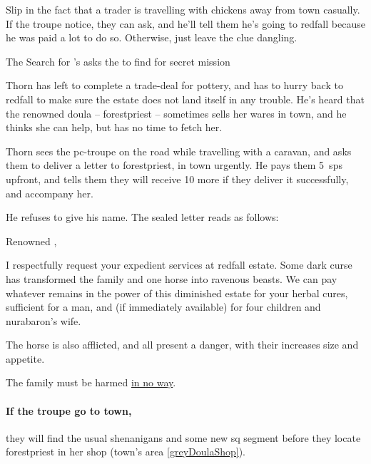 Slip in the fact that a trader is travelling with chickens away from \gls{town} casually.
If the troupe notice, they can ask, and he'll tell them he's going to \gls{redfall} because he was paid a lot to do so.
Otherwise, just leave the clue dangling.

{The Search for }%
{'s  asks the  to find  for secret mission}%
\label{nonstarter}

\begin{exampletext}
  Thorn has left to complete a trade-deal for pottery, and has to hurry back to \gls{redfall} to make sure the estate does not land itself in any trouble.
  He's heard that the renowned \gls{doula} -- \gls{forestpriest} -- sometimes sells her wares in \gls{town}, and he thinks she can help, but has no time to fetch her.
\end{exampletext}

Thorn sees the \gls{pc}-troupe on the road while travelling with a caravan, and asks them to deliver a letter to \gls{forestpriest}, in \gls{town} urgently.
He pays them 5~\glspl{sp} upfront, and tells them they will receive 10 more if they deliver it successfully, and accompany her.

He refuses to give his name.
The sealed letter reads as follows:

\begin{speechtext}
  Renowned ,

  I respectfully request your expedient services at \gls{redfall} estate.
  Some dark curse has transformed the family and one horse into ravenous beasts.
  We can pay whatever remains in the power of this diminished estate for your herbal cures, sufficient for a man, and (if immediately available) for four children and \gls{nurabaron}'s wife.

  The horse is also afflicted, and all present a danger, with their increases size and appetite.

  The family must be harmed \underline{in no way}.
\end{speechtext}

\thornSeneschal

\label{thorn}

\paragraph{If the troupe go to \gls{town},}
they will find the usual shenanigans and some new \gls{sq} \gls{segment} before they locate \gls{forestpriest} in her shop (\gls{town}'s area \vref{greyDoulaShop}).

